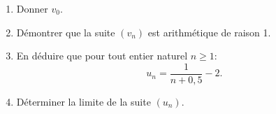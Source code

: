 \documentclass[10pt]{article}
\begin{document}
\begin{enumerate}
	\begin{enumerate}
		\item Donner $v_0$.
		\item Démontrer que la suite $\left(v_n\right)$ est arithmétique de raison 1.
		\item En déduire que pour tout entier naturel $n \geqslant 1 :$
\[u_n = \dfrac{1}{n + 0,5}  - 2.\]
		\item Déterminer la limite de la suite $\left(u_n\right)$.
	\end{enumerate}
\end{enumerate}

\bigskip
\end{document}
